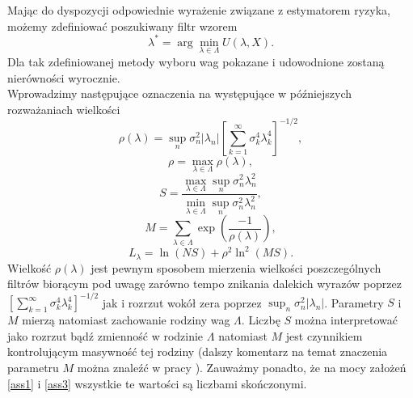 \documentclass{mwart}
\begin{document}
Mając do dyspozycji odpowiednie wyrażenie związane z estymatorem ryzyka, możemy zdefiniować poszukiwany filtr wzorem
\begin{equation}\label{estimator}
\lambda^*=\arg\min_{\lambda\in \Lambda}U(\lambda,X).
\end{equation}
Dla tak zdefiniowanej metody wyboru wag pokazane i udowodnione zostaną nierówności wyrocznie.\\
\indent Wprowadzimy następujące oznaczenia na występujące w późniejszych rozważaniach wielkości
\begin{displaymath}
\rho(\lambda)=\sup_n\sigma_n^2|\lambda_n|\left[\sum_{k=1}^{\infty}\sigma_k^4\lambda_k^4\right]^{-1/2},
\end{displaymath}
\begin{displaymath}
\rho=\max_{\lambda\in \Lambda}\rho(\lambda),
\end{displaymath}
\begin{displaymath}
S=\frac{\max_{\lambda\in\Lambda}\sup_n\sigma_n^2\lambda_n^2}{\min_{\lambda\in \Lambda}\sup_n\sigma_n^2\lambda_n^2},
\end{displaymath}
\begin{displaymath}
M=\sum_{\lambda\in \Lambda}\exp\left(\frac{-1}{\rho(\lambda)}\right),
\end{displaymath}
\begin{displaymath}
L_{\lambda}=\ln(NS)+\rho^2\ln^2(MS).
\end{displaymath}
Wielkość $\rho(\lambda)$ jest pewnym sposobem mierzenia wielkości poszczególnych filtrów biorącym pod uwagę zarówno tempo znikania dalekich wyrazów poprzez $\left[\sum_{k=1}^{\infty}\sigma_k^4\lambda_k^4\right]^{-1/2}$ jak i rozrzut wokół zera poprzez $\sup_n\sigma_n^2|\lambda_n|$. Parametry $S$ i $M$ mierzą natomiast zachowanie rodziny wag $\Lambda$. Liczbę $S$ można interpretować jako rozrzut bądź zmienność w rodzinie $\Lambda$ natomiast $M$ jest czynnikiem kontrolującym masywność tej rodziny (dalszy komentarz na temat znaczenia parametru $M$ można znaleźć w pracy \cite{birge}). Zauważmy ponadto, że na mocy założeń \ref{ass1} i \ref{ass3} wszystkie te wartości są liczbami skończonymi.\\
\end{document}
